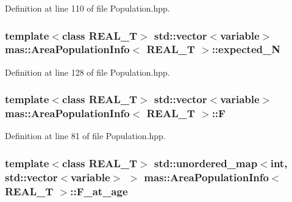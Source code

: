 Definition at line 110 of file Population.\-hpp.

\hypertarget{structmas_1_1_area_population_info_ab421644219439711d69400b0d3ed8917}{
\subsubsection[{expected\-\_\-\-N}]{\setlength{\rightskip}{0pt plus 5cm}template$<$class R\-E\-A\-L\-\_\-\-T$>$ std\-::vector$<${\bf variable}$>$ {\bf mas\-::\-Area\-Population\-Info}$<$ R\-E\-A\-L\-\_\-\-T $>$\-::expected\-\_\-\-N}}\label{structmas_1_1_area_population_info_ab421644219439711d69400b0d3ed8917}


Definition at line 128 of file Population.\-hpp.

\hypertarget{structmas_1_1_area_population_info_a95948eb1ffbe50ce1dd4dd1cb9da292e}{
\subsubsection[{F}]{\setlength{\rightskip}{0pt plus 5cm}template$<$class R\-E\-A\-L\-\_\-\-T$>$ std\-::vector$<${\bf variable}$>$ {\bf mas\-::\-Area\-Population\-Info}$<$ R\-E\-A\-L\-\_\-\-T $>$\-::F}}\label{structmas_1_1_area_population_info_a95948eb1ffbe50ce1dd4dd1cb9da292e}


Definition at line 81 of file Population.\-hpp.

\hypertarget{structmas_1_1_area_population_info_a5638df90f97b38acf6c5421a76fa116b}{
\subsubsection[{F\-\_\-at\-\_\-age}]{\setlength{\rightskip}{0pt plus 5cm}template$<$class R\-E\-A\-L\-\_\-\-T$>$ std\-::unordered\-\_\-map$<$int, std\-::vector$<${\bf variable}$>$ $>$ {\bf mas\-::\-Area\-Population\-Info}$<$ R\-E\-A\-L\-\_\-\-T $>$\-::F\-\_\-at\-\_\-age}}\label{structmas_1_1_area_population_info_a5638df90f97b38acf6c5421a76fa116b}


